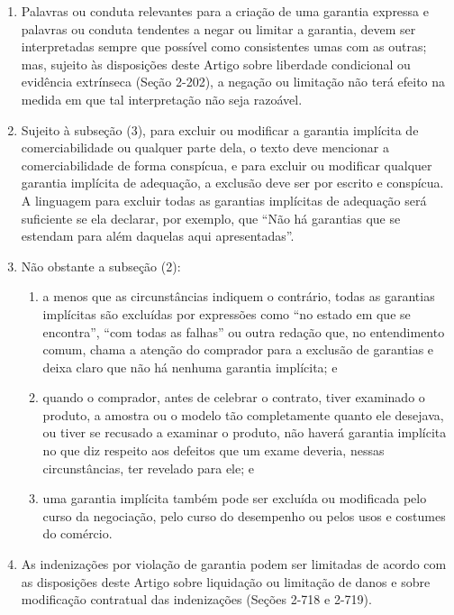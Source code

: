 \documentclass[a4paper, 12pt]{article}
\begin{document}
\begin{enumerate}[label=(\arabic*)]
	\item Palavras ou conduta relevantes para a criação de uma garantia expressa e palavras ou conduta tendentes a negar ou limitar a garantia, devem ser interpretadas sempre que possível como consistentes umas com as outras; mas, sujeito às disposições deste Artigo sobre liberdade condicional ou evidência extrínseca (Seção 2-202), a negação ou limitação não terá efeito na medida em que tal interpretação não seja razoável.
	\item Sujeito à subseção (3), para excluir ou modificar a garantia implícita de comerciabilidade ou qualquer parte dela, o texto deve mencionar a comerciabilidade de forma conspícua, e para excluir ou modificar qualquer garantia implícita de adequação, a exclusão deve ser por escrito e conspícua. A linguagem para excluir todas as garantias implícitas de adequação será suficiente se ela declarar, por exemplo, que ``Não há garantias que se estendam para além daquelas aqui apresentadas''.
	\item Não obstante a subseção (2):
	\begin{enumerate}
		\item a menos que as circunstâncias indiquem o contrário, todas as garantias implícitas são excluídas por expressões como ``no estado em que se encontra'', ``com todas as falhas'' ou outra redação que, no entendimento comum, chama a atenção do comprador para a exclusão de garantias e deixa claro que não há nenhuma garantia implícita; e
		\item quando o comprador, antes de celebrar o contrato, tiver examinado o produto, a amostra ou o modelo tão completamente quanto ele desejava, ou tiver se recusado a examinar o produto, não haverá garantia implícita no que diz respeito aos defeitos que um exame deveria, nessas circunstâncias, ter revelado para ele; e
		\item uma garantia implícita também pode ser excluída ou modificada pelo curso da negociação, pelo curso do desempenho ou pelos usos e costumes do comércio.
	\end{enumerate}
	\item As indenizações por violação de garantia podem ser limitadas de acordo com as disposições deste Artigo sobre liquidação ou limitação de danos e sobre modificação contratual das indenizações (Seções 2-718 e 2-719).
\end{enumerate}
\end{document}
